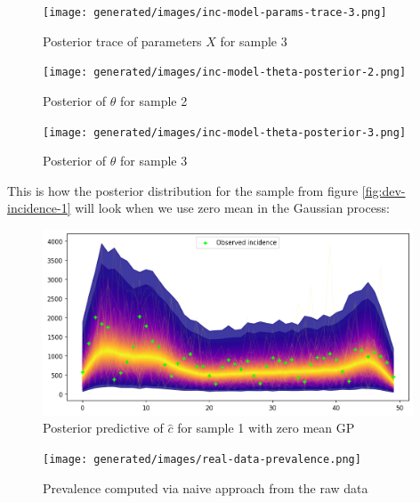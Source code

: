 \documentclass[
  digital, %
  oneside, %
  lof,     %
  lot,     %
]{fithesis4}
\begin{document}
\begin{figure}[H]
  \begin{center}
    \texttt{[image: generated/images/inc-model-params-trace-3.png]}
  \end{center}
  \caption{Posterior trace of parameters $X$ for sample 3}
  \label{fig:params-trace-3}
\end{figure}




\begin{figure}[H]
  \begin{center}
    \texttt{[image: generated/images/inc-model-theta-posterior-2.png]}
  \end{center}
  \caption{Posterior of $\theta$ for sample 2}
  \label{fig:theta-posterior-2}
\end{figure}

\begin{figure}[H]
  \begin{center}
    \texttt{[image: generated/images/inc-model-theta-posterior-3.png]}
  \end{center}
  \caption{Posterior of $\theta$ for sample 3}
  \label{fig:theta-posterior-3}
\end{figure}

\newpage
This is how the posterior distribution for the sample from figure \ref{fig:dev-incidence-1} will look when we use zero mean in the Gaussian process:

\begin{figure}[H]
  \centering
  \includegraphics[width=11cm]{static/images/inc-model-ppc-plot-1-zero-mean.png}
  \caption{Posterior predictive of $\hat{c}$ for sample 1 with zero mean GP}
  \label{fig:incidence-posterior-1-zero-mean}
\end{figure}



\begin{figure}[H]
  \begin{center}
    \texttt{[image: generated/images/real-data-prevalence.png]}
  \end{center}
  \caption{Prevalence computed via naive approach from the raw data}
  \label{fig:real-data-prevalence}
\end{figure}
\end{document}
